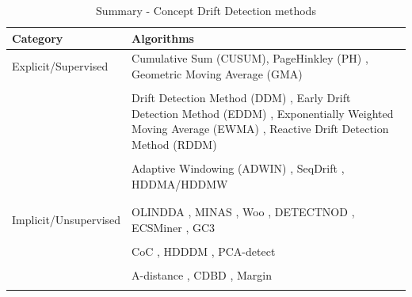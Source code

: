 \documentclass[preprint,12pt]{elsarticle}
\begin{document}
\begin{table}[h]
    \centering

    \caption{Summary - Concept Drift Detection methods \cite{Sethi:2017:RDC:3096751.3096864}}
    \label{tbl:algorithms}

    \begin{tabularx}{\textwidth}{l|X}
    \toprule
    Category & Algorithms \\
    \midrule
    Explicit/Supervised              & Cumulative Sum (CUSUM), PageHinkley (PH) \cite{Page:CUSUM:PageHinkley:1954}, Geometric Moving Average (GMA) \cite{Roberts:2000:CCT:338441.338464} \\
                                     & \\
                                     & Drift Detection Method (DDM) \cite{GamaMCR04}, Early Drift Detection Method (EDDM) \cite{EDDM}, Exponentially Weighted Moving Average (EWMA) \cite{Ross:2012:EWM:2076039.2076307}, Reactive Drift Detection Method (RDDM) \cite{Barros:RDDM:2017} \\
                                     & \\
                                     & Adaptive Windowing (ADWIN) \cite{BifetG07}, SeqDrift \cite{PearsSK14:SeqDrift:2014}, HDDMA/HDDMW \cite{BlancoCRBDM15:HDDMA:HDDMW:2015} \\
                                     & \\
                                     & \\
    Implicit/Unsupervised            & OLINDDA \cite{Spinosa:2007:OCA:1244002.1244107}, MINAS \cite{Faria:2013:NDA:2480362.2480515}, Woo \cite{Ryu:Kantardzic:2012}, DETECTNOD \cite{Hashemi:Hayat:DETECTNOD:2010}, ECSMiner \cite{Masud:2011:CNC:1978259.1978529}, GC3 \cite{Sethi2016b:GC3} \\
                                     & \\
                                     & CoC \cite{Lee:Magoules:CoC:2012}, HDDDM \cite{Ditzler:Polikar:HDDDM:2011}, PCA-detect \cite{Kuncheva:PCADetect:20085} \\
                                     & \\
                                     & A-distance \cite{Dredze:ADistance:2010585}, CDBD \cite{Lindstrom:CDBD:2013}, Margin \cite{Dries:Margin:2009} \\
                                     & \\
    \bottomrule
    \end{tabularx}
\end{table}
\end{document}
